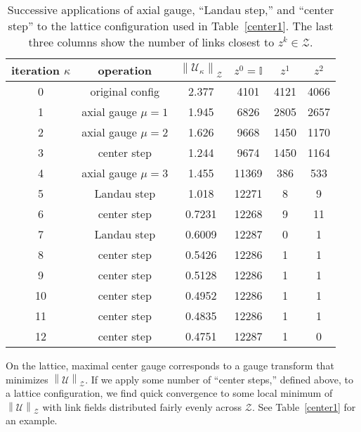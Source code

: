 \documentclass[preprint,aps,prd]{revtex4-2}
\newcommand{\zentrum}{\mathcal{Z}}       %
\newcommand{\config}{\mathcal{U}}
\newcommand\znorm[1]{\left\lVert #1 \right\rVert_\zentrum}
\begin{document}
\begin{table}
  \caption{Successive applications of axial gauge,
    ``Landau step,'' and ``center step'' to the lattice configuration
    used in Table~\ref{center1}.
    The last three columns show the number of links closest
    to $z^k \in \zentrum$.
    \label{center4}}
  \begin{tabular}{c|c|c|ccc}
    iteration $\kappa$ & operation & $\znorm{\config_\kappa}$
     & $z^0=\mathbb{I}$ & $z^1$ & $z^2$ \\
    \hline
    0 & original config    & 2.377  & 4101 & 4121 & 4066\\
    1 & axial gauge $\mu=1$& 1.945  & 6826 & 2805 & 2657\\
    2 & axial gauge $\mu=2$& 1.626  & 9668 & 1450 & 1170\\
    3 & center step        & 1.244  & 9674 & 1450 & 1164\\
    4 & axial gauge $\mu=3$& 1.455  & 11369 & 386 & 533\\
    5 & Landau step        & 1.018  & 12271 &   8 &   9\\
    6 & center step        & 0.7231 & 12268 &   9 &  11\\
    7 & Landau step        & 0.6009 & 12287 &   0 &   1\\
    8 & center step        & 0.5426 & 12286 &   1 &   1\\
    9 & center step        & 0.5128 & 12286 &   1 &   1\\
    10 & center step       & 0.4952 & 12286 &   1 &   1\\
    11 & center step       & 0.4835 & 12286 &   1 &   1\\
    12 & center step       & 0.4751 & 12287 &   1 &   0\\
  \end{tabular}
  \end{table}

On the lattice, maximal center gauge corresponds
to a gauge transform that minimizes $\znorm{\config}$. 
If we apply some number of ``center steps,'' defined above,
to a lattice configuration, we find quick convergence to some local
minimum of $\znorm{\config}$ with
link fields distributed fairly evenly across $\zentrum$.
See Table~\ref{center1} for an example.
\end{document}
